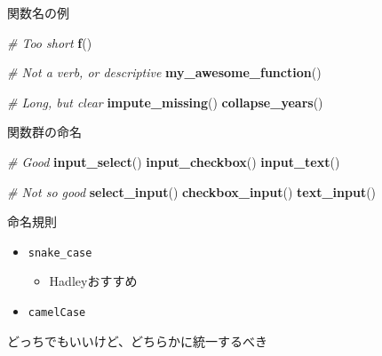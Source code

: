 \documentclass[ignorenonframetext,]{beamer}
\newenvironment{Shaded}{\begin{snugshade}}{\end{snugshade}}
\newcommand{\KeywordTok}[1]{\textcolor[rgb]{0.13,0.29,0.53}{\textbf{#1}}}
\newcommand{\CommentTok}[1]{\textcolor[rgb]{0.56,0.35,0.01}{\textit{#1}}}
\newcommand{\NormalTok}[1]{#1}
\providecommand{\tightlist}{%
  \setlength{\itemsep}{0pt}\setlength{\parskip}{0pt}}
\begin{document}
\begin{frame}[fragile]{関数名の例}

\begin{Shaded}
\begin{Highlighting}[]
\CommentTok{# Too short}
\KeywordTok{f}\NormalTok{()}

\CommentTok{# Not a verb, or descriptive}
\KeywordTok{my_awesome_function}\NormalTok{()}

\CommentTok{# Long, but clear}
\KeywordTok{impute_missing}\NormalTok{()}
\KeywordTok{collapse_years}\NormalTok{()}
\end{Highlighting}
\end{Shaded}

\end{frame}

\begin{frame}[fragile]{関数群の命名}

\begin{Shaded}
\begin{Highlighting}[]
\CommentTok{# Good}
\KeywordTok{input_select}\NormalTok{()}
\KeywordTok{input_checkbox}\NormalTok{()}
\KeywordTok{input_text}\NormalTok{()}

\CommentTok{# Not so good}
\KeywordTok{select_input}\NormalTok{()}
\KeywordTok{checkbox_input}\NormalTok{()}
\KeywordTok{text_input}\NormalTok{() }
\end{Highlighting}
\end{Shaded}

\end{frame}

\begin{frame}[fragile]{命名規則}

\begin{itemize}
\tightlist
\item
  \texttt{snake\_case}

  \begin{itemize}
  \tightlist
  \item
    Hadleyおすすめ
  \end{itemize}
\item
  \texttt{camelCase}
\end{itemize}

どっちでもいいけど、どちらかに統一するべき

\end{frame}
\end{document}
